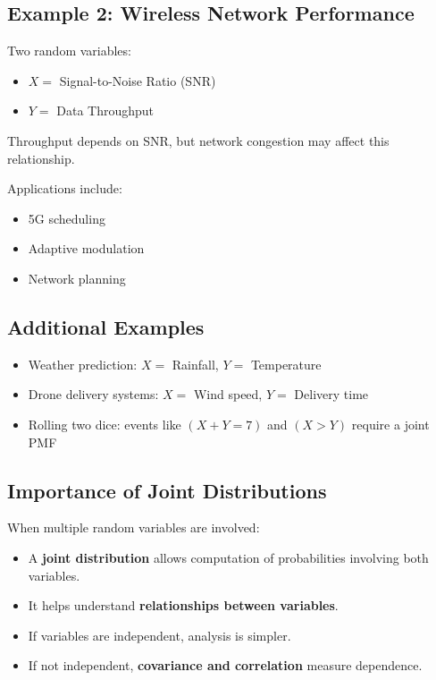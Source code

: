 \documentclass[12pt]{article}
\begin{document}
\subsection*{Example 2: Wireless Network Performance}

Two random variables:

\begin{itemize}
\item $X =$ Signal-to-Noise Ratio (SNR)
\item $Y =$ Data Throughput
\end{itemize}

Throughput depends on SNR, but network congestion may affect this relationship.

Applications include:

\begin{itemize}
\item 5G scheduling
\item Adaptive modulation
\item Network planning
\end{itemize}

\subsection*{Additional Examples}

\begin{itemize}
\item Weather prediction: $X =$ Rainfall, $Y =$ Temperature
\item Drone delivery systems: $X =$ Wind speed, $Y =$ Delivery time
\item Rolling two dice: events like $(X+Y=7)$ and $(X>Y)$ require a joint PMF
\end{itemize}

\subsection*{Importance of Joint Distributions}

When multiple random variables are involved:

\begin{itemize}
\item A \textbf{joint distribution} allows computation of probabilities involving both variables.
\item It helps understand \textbf{relationships between variables}.
\item If variables are independent, analysis is simpler.
\item If not independent, \textbf{covariance and correlation} measure dependence.
\end{itemize}
\end{document}
